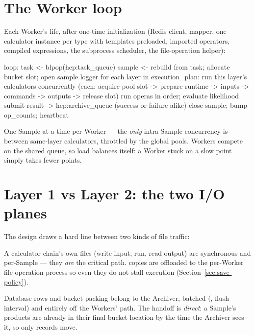\section{The Worker loop}
\label{sec:worker-loop}

Each Worker's life, after one-time initialization (Redis client, mapper, one calculator
instance per type with templates preloaded, imported operators, compiled expressions,
the subprocess scheduler, the file-operation helper):

\begin{plaincode}
loop:
  task <- blpop(hep:task_queue)
  sample <- rebuild from task; allocate bucket slot; open sample logger
  for each layer in execution_plan:
      run this layer's calculators concurrently
        (each: acquire pool slot -> prepare runtime -> inputs ->
         commands -> outputs -> release slot)
  run operas in order; evaluate likelihood
  submit result -> hep:archive_queue        (success or failure alike)
  close sample; bump op_counts; heartbeat
\end{plaincode}

One Sample at a time per Worker --- the \emph{only} intra-Sample concurrency is between
same-layer calculators, throttled by the global pools. Workers compete on the shared
queue, so load balances itself: a Worker stuck on a slow point simply takes fewer
points.

\section{Layer 1 vs Layer 2: the two I/O planes}
\label{sec:two-layers}

The design draws a hard line between two kinds of file traffic:

\begin{description}[style=nextline, leftmargin=1.2em]
  \item[Layer 1 --- inside the Sample.] A calculator chain's own files (write input,
        run, read output) are synchronous and per-Sample --- they \emph{are} the
        critical path.  copies are offloaded to the per-Worker
        file-operation process so even they do not stall execution
        (Section~\ref{sec:save-policy}).
  \item[Layer 2 --- after the Sample.] Database rows and bucket packing belong to the
        Archiver, batched (, flush interval) and entirely
        off the Workers' path. The handoff is \emph{direct}: a Sample's products are
        already in their final bucket location by the time the Archiver sees it, so only
        records move.
\end{description}


